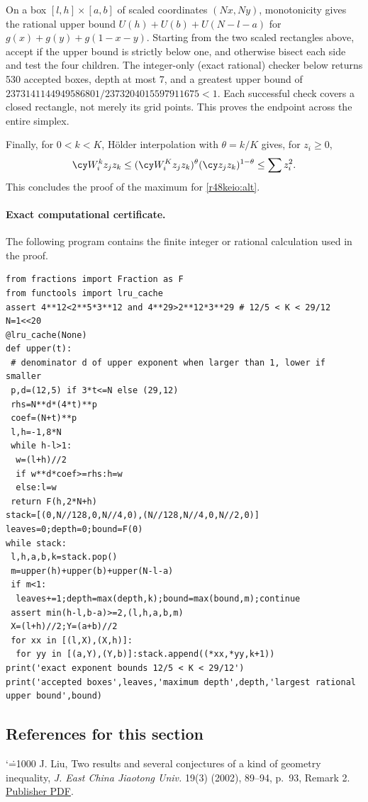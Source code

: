 \documentclass[11pt,a4paper]{article}
\makeatletter
\numberwithin{equation}{section}
\theoremstyle{definition}
\theoremstyle{remark}
\renewenvironment{thebibliography}[1]
 {\subsection*{References for this section}\small
  \list{\@biblabel{\@arabic\c@enumiv}}
       {\settowidth\labelwidth{\@biblabel{#1}}\leftmargin\labelwidth
        \advance\leftmargin\labelsep\@openbib@code
        \usecounter{enumiv}\let\p@enumiv\@empty
        \renewcommand\theenumiv{\@arabic\c@enumiv}}
  \sloppy\clubpenalty4000\widowpenalty4000\sfcode`\.=1000\relax}
 {\def\@noitemerr{\@latex@warning{Empty bibliography}}\endlist}
\makeatother
\begin{document}
On a box $[l,h]\times[a,b]$ of scaled coordinates $(Nx,Ny)$, monotonicity gives the rational upper bound $U(h)+U(b)+U(N-l-a)$ for $g(x)+g(y)+g(1-x-y)$. Starting from the two scaled rectangles above, accept if the upper bound is strictly below one, and otherwise bisect each side and test the four children. The integer-only (exact rational) checker below returns 530 accepted boxes, depth at most 7, and a greatest upper bound of $2373141144949586801/2373204015597911675<1$. Each successful check covers a closed rectangle, not merely its grid points. This proves the endpoint across the entire simplex.

Finally, for $0<k<K$, H\"older interpolation with $\theta=k/K$ gives, for $z_i\ge0$,
\[
 \cy W_i^k z_jz_k\le
 (\cy W_i^K z_jz_k)^\theta(\cy z_jz_k)^{1-\theta}\le\sum z_i^2 .
\]
This concludes the proof of the maximum for \eqref{r48keio:alt}.

\paragraph{Exact computational certificate.}
The following program contains the finite integer or rational calculation used in the proof.
{\small
\begin{Verbatim}
from fractions import Fraction as F
from functools import lru_cache
assert 4**12<2**5*3**12 and 4**29>2**12*3**29 # 12/5 < K < 29/12
N=1<<20
@lru_cache(None)
def upper(t):
 # denominator d of upper exponent when larger than 1, lower if smaller
 p,d=(12,5) if 3*t<=N else (29,12)
 rhs=N**d*(4*t)**p
 coef=(N+t)**p
 l,h=-1,8*N
 while h-l>1:
  w=(l+h)//2
  if w**d*coef>=rhs:h=w
  else:l=w
 return F(h,2*N+h)
stack=[(0,N//128,0,N//4,0),(N//128,N//4,0,N//2,0)]
leaves=0;depth=0;bound=F(0)
while stack:
 l,h,a,b,k=stack.pop()
 m=upper(h)+upper(b)+upper(N-l-a)
 if m<1:
  leaves+=1;depth=max(depth,k);bound=max(bound,m);continue
 assert min(h-l,b-a)>=2,(l,h,a,b,m)
 X=(l+h)//2;Y=(a+b)//2
 for xx in [(l,X),(X,h)]:
  for yy in [(a,Y),(Y,b)]:stack.append((*xx,*yy,k+1))
print('exact exponent bounds 12/5 < K < 29/12')
print('accepted boxes',leaves,'maximum depth',depth,'largest rational upper bound',bound)
\end{Verbatim}

}

\begin{thebibliography}{1}
 J. Liu, Two results and several conjectures of a kind of geometry inequality, \emph{J. East China Jiaotong Univ.} 19(3) (2002), 89--94, p.~93, Remark 2. \href{https://journal.ecjtu.edu.cn/hdjtdx/article/pdf/20020327}{Publisher PDF}.
\end{thebibliography}
\end{document}

